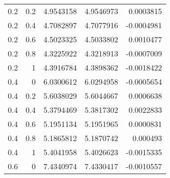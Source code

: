 \begin{table}[]
\begin{latin}
\begin{tabular}{@{}rrrrr@{}}
			0.2                      & 0.2                      & 4.9543158                                  & 4.9546973                                     & 0.0003815                 \\
			0.2                      & 0.4                      & 4.7082897                                  & 4.7077916                                     & -0.0004981                \\
			0.2                      & 0.6                      & 4.5023325                                  & 4.5033802                                     & 0.0010477                 \\
			0.2                      & 0.8                      & 4.3225922                                  & 4.3218913                                     & -0.0007009                \\
			0.2                      & 1                        & 4.3916784                                  & 4.3898362                                     & -0.0018422                \\
			0.4                      & 0                        & 6.0300612                                  & 6.0294958                                     & -0.0005654                \\
			0.4                      & 0.2                      & 5.6038029                                  & 5.6044667                                     & 0.0006638                 \\
			0.4                      & 0.4                      & 5.3794469                                  & 5.3817302                                     & 0.0022833                 \\
			0.4                      & 0.6                      & 5.1951134                                  & 5.1951965                                     & 0.0000831                 \\
			0.4                      & 0.8                      & 5.1865812                                  & 5.1870742                                     & 0.000493                  \\
			0.4                      & 1                        & 5.4041958                                  & 5.4026623                                     & -0.0015335                \\
			0.6                      & 0                        & 7.4340974                                  & 7.4330417                                     & -0.0010557                \\

\end{tabular}
\end{latin}
\end{table}
